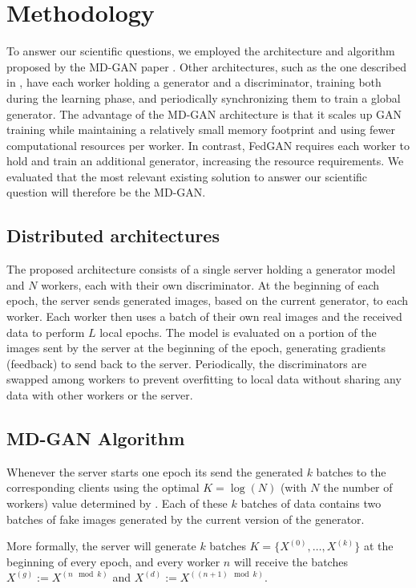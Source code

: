 \chapter{Methodology}
\label{chap:methodology}
To answer our scientific questions, we employed the architecture and algorithm proposed by the MD-GAN paper \cite{mdgan}. Other architectures, such as the one described in \cite{fedgan}, have each worker holding a generator and a discriminator, training both during the learning phase, and periodically synchronizing them to train a global generator. The advantage of the MD-GAN architecture is that it scales up GAN training while maintaining a relatively small memory footprint and using fewer computational resources per worker. In contrast, FedGAN requires each worker to hold and train an additional generator, increasing the resource requirements. We evaluated that the most relevant existing solution to answer our scientific question will therefore be the MD-GAN. 

\section{Distributed architectures}
The proposed architecture consists of a single server holding a generator model and $N$ workers, each with their own discriminator. At the beginning of each epoch, the server sends generated images, based on the current generator, to each worker. Each worker then uses a batch of their own real images and the received data to perform $L$ local epochs. The model is evaluated on a portion of the images sent by the server at the beginning of the epoch, generating gradients (feedback) to send back to the server. Periodically, the discriminators are swapped among workers to prevent overfitting to local data without sharing any data with other workers or the server.

\section{MD-GAN Algorithm}
Whenever the server starts one epoch its send the generated $k$ batches to the corresponding clients using the optimal $K=\log(N)$ (with $N$ the number of workers) value determined by \cite{mdgan}. Each of these $k$ batches of data contains two batches of fake images generated by the current version of the generator.

More formally, the server will generate $k$ batches $K = \{X^{(0)}, \dots, X^{(k)}\}$ at the beginning of every epoch, and every worker $n$ will receive the batches $X^{(g)} := X^{(n \mod k)}$ and $X^{(d)} := X^{((n+1) \mod k)}$.

